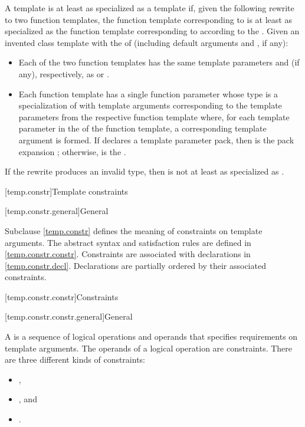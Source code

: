 \pnum
A template   is
at least as specialized as a template  
if, given the following rewrite to two function templates,
the function template corresponding to 
is at least as specialized as
the function template corresponding to 
according to the .
Given an invented class template 
with the  of  (including default arguments
and , if any):
\begin{itemize}
\item
Each of the two function templates has the same template parameters
and  (if any),
respectively, as  or .
\item
Each function template has a single function parameter
whose type is a specialization of 
with template arguments corresponding to the template parameters
from the respective function template where,
for each template parameter 
in the  of the function template,
a corresponding template argument  is formed.
If  declares a template parameter pack,
then  is the pack expansion ;
otherwise,  is the  .
\end{itemize}
If the rewrite produces an invalid type,
then  is not at least as specialized as .

[temp.constr]{Template constraints}

[temp.constr.general]{General}

\pnum
\begin{note}
Subclause \ref{temp.constr} defines the meaning of constraints on template arguments.
The abstract syntax and satisfaction rules are defined
in \ref{temp.constr.constr}.
Constraints are associated with declarations in \ref{temp.constr.decl}.
Declarations are partially ordered by their associated constraints.
\end{note}

[temp.constr.constr]{Constraints}

[temp.constr.constr.general]{General}

%

\pnum
A  is a sequence of logical operations and
operands that specifies requirements on template arguments.
The operands of a logical operation are constraints.
There are three different kinds of constraints:
\begin{itemize}
\item {},
\item {}, and
\item {}.
\end{itemize}

